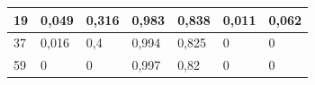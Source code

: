 \documentclass{classrep}
\begin{document}
{\begin{table}[H]
\begin{center}
\begin{tabular}{|l|l|l|l|l|l|l|}
19                                                                 & 0,049                                                                  & 0,316                                                                     & 0,983                                                         & 0,838                                                            & 0,011                                                            & 0,062                                                               \\ \hline
37                                                                 & 0,016                                                                  & 0,4                                                                       & 0,994                                                         & 0,825                                                            & 0                                                                & 0                                                                   \\ \hline
59                                                                 & 0                                                                      & 0                                                                         & 0,997                                                         & 0,82                                                             & 0                                                                & 0                                                                   \\ \hline
\end{tabular}
\end{center}
\end{table}


}
\end{document}
